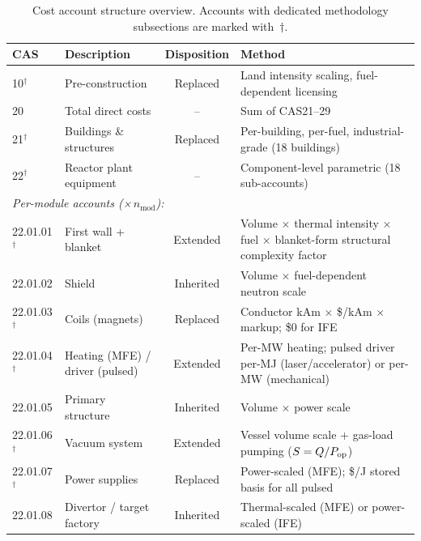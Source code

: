 \documentclass{article}
\begin{document}
\begin{table}[htbp]
\caption{Cost account structure overview. Accounts with dedicated
methodology subsections are marked with~$\dagger$.}
\label{tab:cas-overview}
\centering
\small
\begin{tabular}{llcp{6.0cm}}
\toprule
CAS & Description & Disposition & Method \\
\midrule
10$^\dagger$ & Pre-construction & Replaced & Land intensity scaling, fuel-dependent licensing \\
20 & Total direct costs & -- & Sum of CAS21--29 \\
21$^\dagger$ & Buildings \& structures & Replaced & Per-building, per-fuel, industrial-grade (18 buildings) \\
22$^\dagger$ & Reactor plant equipment & -- & Component-level parametric (18 sub-accounts) \\
\multicolumn{4}{l}{\textit{Per-module accounts (×\,$n_{\text{mod}}$):}} \\
\hspace{1em}22.01.01$^\dagger$ & First wall + blanket & Extended & Volume $\times$ thermal intensity $\times$ fuel $\times$ blanket-form structural complexity factor \\
\hspace{1em}22.01.02 & Shield & Inherited & Volume $\times$ fuel-dependent neutron scale \\
\hspace{1em}22.01.03$^\dagger$ & Coils (magnets) & Replaced & Conductor kAm $\times$ \$/kAm $\times$ markup; \$0 for IFE \\
\hspace{1em}22.01.04$^\dagger$ & Heating (MFE) / driver (pulsed) & Extended & Per-MW heating; pulsed driver per-MJ (laser/accelerator) or per-MW (mechanical) \\
\hspace{1em}22.01.05 & Primary structure & Inherited & Volume $\times$ power scale \\
\hspace{1em}22.01.06$^\dagger$ & Vacuum system & Extended & Vessel volume scale + gas-load pumping ($S=Q/P_{\rm op}$) \\
\hspace{1em}22.01.07$^\dagger$ & Power supplies & Replaced & Power-scaled (MFE); \$/J stored basis for all pulsed \\
\hspace{1em}22.01.08 & Divertor / target factory & Inherited & Thermal-scaled (MFE) or power-scaled (IFE) \\

\end{tabular}
\end{table}
\end{document}
